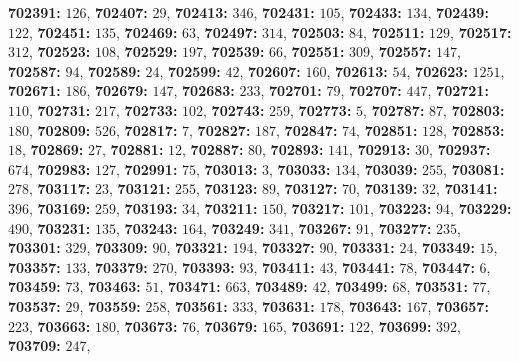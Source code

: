 \textsf{\bfseries 702391:} $126$, \textsf{\bfseries 702407:} $29$, \textsf{\bfseries 702413:} $346$, \textsf{\bfseries 702431:} $105$, \textsf{\bfseries 702433:} $134$, \textsf{\bfseries 702439:} $122$, \textsf{\bfseries 702451:} $135$, \textsf{\bfseries 702469:} $63$, \textsf{\bfseries 702497:} $314$, \textsf{\bfseries 702503:} $84$, \textsf{\bfseries 702511:} $129$, \textsf{\bfseries 702517:} $312$, \textsf{\bfseries 702523:} $108$, \textsf{\bfseries 702529:} $197$, \textsf{\bfseries 702539:} $66$, \textsf{\bfseries 702551:} $309$, \textsf{\bfseries 702557:} $147$, \textsf{\bfseries 702587:} $94$, \textsf{\bfseries 702589:} $24$, \textsf{\bfseries 702599:} $42$, \textsf{\bfseries 702607:} $160$, \textsf{\bfseries 702613:} $54$, \textsf{\bfseries 702623:} $1251$, \textsf{\bfseries 702671:} $186$, \textsf{\bfseries 702679:} $147$, \textsf{\bfseries 702683:} $233$, \textsf{\bfseries 702701:} $79$, \textsf{\bfseries 702707:} $447$, \textsf{\bfseries 702721:} $110$, \textsf{\bfseries 702731:} $217$, \textsf{\bfseries 702733:} $102$, \textsf{\bfseries 702743:} $259$, \textsf{\bfseries 702773:} $5$, \textsf{\bfseries 702787:} $87$, \textsf{\bfseries 702803:} $180$, \textsf{\bfseries 702809:} $526$, \textsf{\bfseries 702817:} $7$, \textsf{\bfseries 702827:} $187$, \textsf{\bfseries 702847:} $74$, \textsf{\bfseries 702851:} $128$, \textsf{\bfseries 702853:} $18$, \textsf{\bfseries 702869:} $27$, \textsf{\bfseries 702881:} $12$, \textsf{\bfseries 702887:} $80$, \textsf{\bfseries 702893:} $141$, \textsf{\bfseries 702913:} $30$, \textsf{\bfseries 702937:} $674$, \textsf{\bfseries 702983:} $127$, \textsf{\bfseries 702991:} $75$, \textsf{\bfseries 703013:} $3$, \textsf{\bfseries 703033:} $134$, \textsf{\bfseries 703039:} $255$, \textsf{\bfseries 703081:} $278$, \textsf{\bfseries 703117:} $23$, \textsf{\bfseries 703121:} $255$, \textsf{\bfseries 703123:} $89$, \textsf{\bfseries 703127:} $70$, \textsf{\bfseries 703139:} $32$, \textsf{\bfseries 703141:} $396$, \textsf{\bfseries 703169:} $259$, \textsf{\bfseries 703193:} $34$, \textsf{\bfseries 703211:} $150$, \textsf{\bfseries 703217:} $101$, \textsf{\bfseries 703223:} $94$, \textsf{\bfseries 703229:} $490$, \textsf{\bfseries 703231:} $135$, \textsf{\bfseries 703243:} $164$, \textsf{\bfseries 703249:} $341$, \textsf{\bfseries 703267:} $91$, \textsf{\bfseries 703277:} $235$, \textsf{\bfseries 703301:} $329$, \textsf{\bfseries 703309:} $90$, \textsf{\bfseries 703321:} $194$, \textsf{\bfseries 703327:} $90$, \textsf{\bfseries 703331:} $24$, \textsf{\bfseries 703349:} $15$, \textsf{\bfseries 703357:} $133$, \textsf{\bfseries 703379:} $270$, \textsf{\bfseries 703393:} $93$, \textsf{\bfseries 703411:} $43$, \textsf{\bfseries 703441:} $78$, \textsf{\bfseries 703447:} $6$, \textsf{\bfseries 703459:} $73$, \textsf{\bfseries 703463:} $51$, \textsf{\bfseries 703471:} $663$, \textsf{\bfseries 703489:} $42$, \textsf{\bfseries 703499:} $68$, \textsf{\bfseries 703531:} $77$, \textsf{\bfseries 703537:} $29$, \textsf{\bfseries 703559:} $258$, \textsf{\bfseries 703561:} $333$, \textsf{\bfseries 703631:} $178$, \textsf{\bfseries 703643:} $167$, \textsf{\bfseries 703657:} $223$, \textsf{\bfseries 703663:} $180$, \textsf{\bfseries 703673:} $76$, \textsf{\bfseries 703679:} $165$, \textsf{\bfseries 703691:} $122$, \textsf{\bfseries 703699:} $392$, \textsf{\bfseries 703709:} $247$, 
